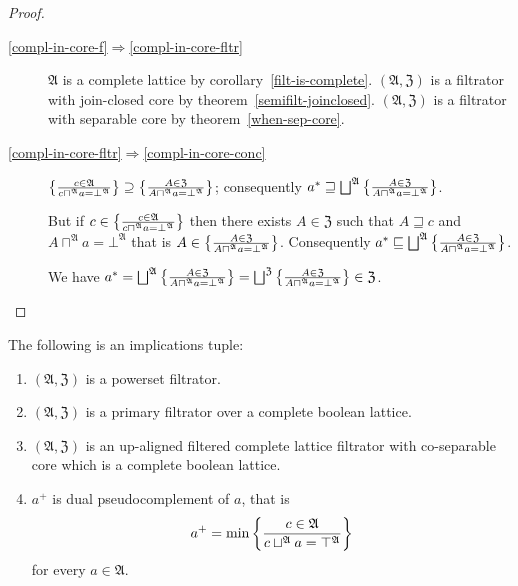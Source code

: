 \begin{proof}
~
\begin{description}
\item [{\ref{compl-in-core-f}$\Rightarrow$\ref{compl-in-core-fltr}}] $\mathfrak{A}$
is a complete lattice by corollary~\ref{filt-is-complete}. $(\mathfrak{A},\mathfrak{Z})$
is a filtrator with join-closed core by theorem~\ref{semifilt-joinclosed}.
$(\mathfrak{A},\mathfrak{Z})$ is a filtrator with separable core
by theorem~\ref{when-sep-core}.
\item [{\ref{compl-in-core-fltr}$\Rightarrow$\ref{compl-in-core-conc}}] $\left\{ \frac{c\in\mathfrak{A}}{c\sqcap^{\mathfrak{A}}a=\bot^{\mathfrak{A}}}\right\}\supseteq\left\{ \frac{A\in\mathfrak{Z}}{A\sqcap^{\mathfrak{A}}a=\bot^{\mathfrak{A}}}\right\}$;
consequently $a^{\ast}\sqsupseteq\bigsqcup^{\mathfrak{A}}\setcond{A\in\mathfrak{Z}}{A\sqcap^{\mathfrak{A}}a=\bot^{\mathfrak{A}}}$.


But if $c\in\left\{ \frac{c\in\mathfrak{A}}{c\sqcap^{\mathfrak{A}}a=\bot^{\mathfrak{A}}}\right\}$
then there exists $A\in\mathfrak{Z}$ such that $A\sqsupseteq c$
and $A\sqcap^{\mathfrak{A}}a=\bot^{\mathfrak{A}}$ that is $A\in\left\{ \frac{A\in\mathfrak{Z}}{A\sqcap^{\mathfrak{A}}a=\bot^{\mathfrak{A}}}\right\}$.
Consequently $a^{\ast}\sqsubseteq\bigsqcup^{\mathfrak{A}}\setcond{A\in\mathfrak{Z}}{A\sqcap^{\mathfrak{A}}a=\bot^{\mathfrak{A}}}$.


We have $a^{\ast}=\bigsqcup^{\mathfrak{A}}\setcond{A\in\mathfrak{Z}}{A\sqcap^{\mathfrak{A}}a=\bot^{\mathfrak{A}}}=\bigsqcup^{\mathfrak{Z}}\setcond{A\in\mathfrak{Z}}{A\sqcap^{\mathfrak{A}}a=\bot^{\mathfrak{A}}}\in\mathfrak{Z}$.

\end{description}
\end{proof}
\begin{thm}
\label{dual-compl-pseudo}The following is an implications tuple:
\begin{enumerate}
\item \label{dual-compl-pseudo-p}$(\mathfrak{A},\mathfrak{Z})$ is a powerset
filtrator.
\item \label{dual-compl-pseudo-f}$(\mathfrak{A},\mathfrak{Z})$ is a primary
filtrator over a complete boolean lattice.
\item \label{dual-compl-pseudo-fltr}$(\mathfrak{A},\mathfrak{Z})$ is an
up-aligned filtered complete lattice filtrator with co-separable core
which is a complete boolean lattice.
\item \label{dual-compl-pseudo-conc}$a^{+}$ is dual pseudocomplement of
$a$, that is
\[
a^{+}=\min\left\{ \frac{c\in\mathfrak{A}}{c\sqcup^{\mathfrak{A}}a=\top^{\mathfrak{A}}}\right\}
\]
for every $a\in\mathfrak{A}$.
\end{enumerate}
\end{thm}
